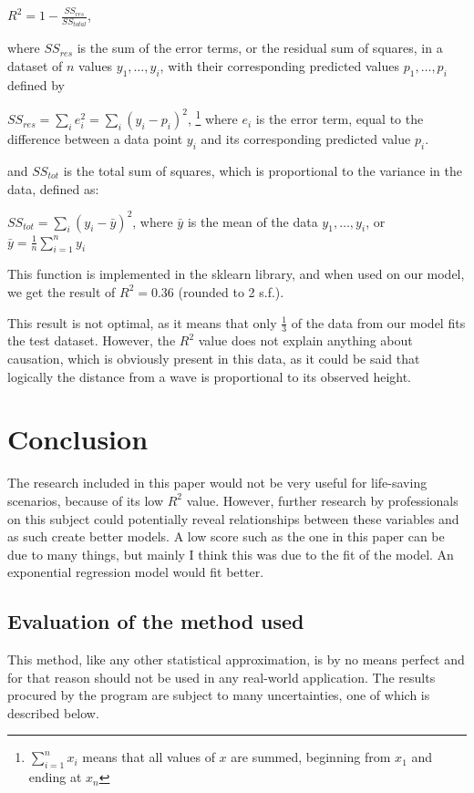 \documentclass[11pt,letterpaper]{article}
\begin{document}
$R^2 = 1 - \frac{SS_{res}}{SS_{total}}$,

where $SS_{res}$ is the sum of the error terms, or the residual sum of squares, in a dataset of $n$ values $y_1,\dots, y_i$, with their corresponding predicted values $p_1,\dots, p_i$ defined by

$SS_{res} = \sum\limits_{i} e_i^2 = \sum\limits_{i} (y_i - p_i)^2$, \footnote{$\sum\limits_{i=1}^n x_i$ means that all values of $x$ are summed, beginning from $x_1$ and ending at $x_n$} where $e_i$ is the error term, equal to the difference between a data point $y_i$ and its corresponding predicted value $p_i$.

and $SS_{tot}$ is the total sum of squares, which is proportional to the variance in the data, defined as:

$SS_{tot} = \sum\limits_{i} (y_i - \bar y)^2$, where $\bar y$ is the mean of the data $y_1,\dots, y_i$, or $\bar y = \frac{1}{n} \sum\limits_{i=1}^n y_i$

This function is implemented in the sklearn library, and when used on our model, we get the result of $R^2 = 0.36$ (rounded to 2 s.f.).

This result is not optimal, as it means that only $\frac{1}{3}$ of the data from our model fits the test dataset. However, the $R^2$ value does not explain anything about causation, which is obviously present in this data, as it could be said that logically the distance from a wave is proportional to its observed height.


\section{Conclusion}

The research included in this paper would not be very useful for life-saving scenarios, because of its low $R^2$ value. However, further research by professionals on this subject could potentially reveal relationships between these variables and as such create better models. A low score such as the one in this paper can be due to many things, but mainly I think this was due to the fit of the model. An exponential regression model would fit better.  


\subsection{Evaluation of the method used}

This method, like any other statistical approximation, is by no means perfect and for that reason should not be used in any real-world application. The results procured by the program are subject to many uncertainties, one of which is described below.
\end{document}
